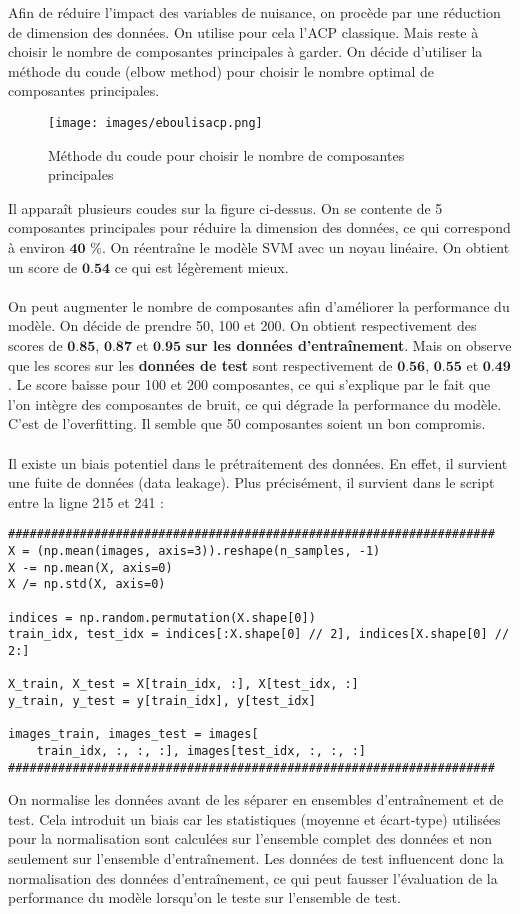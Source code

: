 \documentclass[a4paper, 12pt]{article}
\begin{document}
Afin de réduire l'impact des variables de nuisance, on procède par une réduction de dimension des données. On utilise pour cela l'ACP classique. Mais reste à choisir le nombre de composantes principales à garder. On décide d'utiliser la méthode du coude (elbow method) pour choisir le nombre optimal de composantes principales.

\begin{figure}[h!]
    \centering
    \texttt{[image: images/eboulisacp.png]}
    \caption{Méthode du coude pour choisir le nombre de composantes principales}
    \label{fig:elbow}
\end{figure}

Il apparaît plusieurs coudes sur la figure ci-dessus. On se contente de 5 composantes principales pour réduire la dimension des données, ce qui correspond à environ $\textbf{40 \% }$.
On réentraîne le modèle SVM avec un noyau linéaire. On obtient un score de $\textbf{0.54}$ ce qui est légèrement mieux.
\\
\\
On peut augmenter le nombre de composantes afin d'améliorer la performance du modèle. On décide de prendre 50, 100 et 200. On obtient respectivement des scores de $\textbf{0.85}$, $\textbf{0.87}$ et $\textbf{0.95}$ \textbf{sur les données d'entraînement}. Mais on observe que les scores sur les \textbf{données de test} sont respectivement de $\textbf{0.56}$, $\textbf{0.55}$ et $\textbf{0.49}$.
Le score baisse pour 100 et 200 composantes, ce qui s'explique par le fait que l'on intègre des composantes de bruit, ce qui dégrade la performance du modèle. C'est de l'overfitting.
Il semble que 50 composantes soient un bon compromis.
\\
\\
Il existe un biais potentiel dans le prétraitement des données. En effet, il survient une fuite de données (data leakage).
Plus précisément, il survient dans le script entre la ligne 215 et 241 :

\begin{verbatim}
####################################################################
X = (np.mean(images, axis=3)).reshape(n_samples, -1)
X -= np.mean(X, axis=0)
X /= np.std(X, axis=0)

indices = np.random.permutation(X.shape[0])
train_idx, test_idx = indices[:X.shape[0] // 2], indices[X.shape[0] // 2:]

X_train, X_test = X[train_idx, :], X[test_idx, :]
y_train, y_test = y[train_idx], y[test_idx]

images_train, images_test = images[
    train_idx, :, :, :], images[test_idx, :, :, :]
####################################################################
\end{verbatim}

On normalise les données avant de les séparer en ensembles d'entraînement et de test. Cela introduit un biais car les statistiques (moyenne et écart-type) utilisées pour la normalisation sont calculées sur l'ensemble complet des données et non seulement sur l'ensemble d'entraînement.
Les données de test influencent donc la normalisation des données d'entraînement, ce qui peut fausser l'évaluation de la performance du modèle lorsqu'on le teste sur l'ensemble de test.
\end{document}
